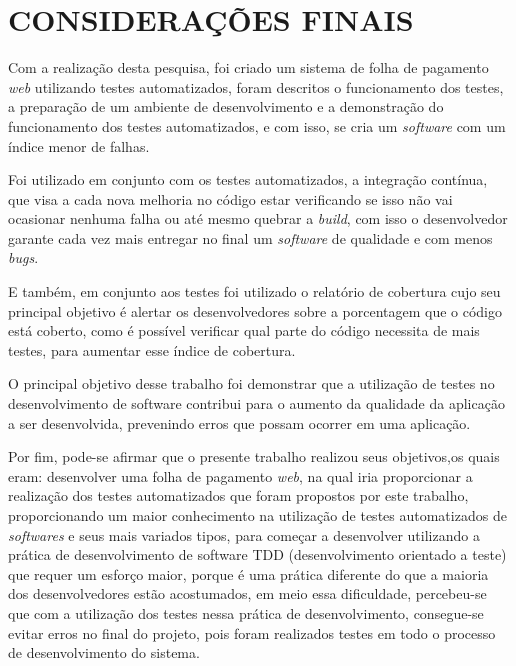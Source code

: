 

\chapter{CONSIDERAÇÕES FINAIS} 
\begin{comment}
\par A conclusão deste trabalho é \ldots

\par Assim conclui-se que \ldots
\end{comment}


\par Com a realização desta pesquisa, foi criado um sistema de folha de pagamento \textit{web} utilizando testes automatizados, foram descritos o funcionamento dos testes, a preparação de um ambiente de desenvolvimento e a demonstração do funcionamento dos testes automatizados, e com isso, se cria um \textit{software} com um índice menor de falhas.

\par Foi utilizado em conjunto com os testes automatizados, a integração contínua, que visa a cada nova melhoria no código estar verificando se isso não vai ocasionar nenhuma falha ou até mesmo quebrar a \textit{build}, com isso o desenvolvedor garante cada vez mais entregar no final um \textit{software} de qualidade e com menos \textit{bugs}.

\par E também, em conjunto aos testes foi utilizado o relatório de cobertura cujo seu principal objetivo é alertar os desenvolvedores sobre a porcentagem que o código está coberto, como é possível verificar qual parte do código necessita de mais testes, para aumentar esse índice de cobertura.

\par O principal objetivo desse trabalho foi demonstrar que a utilização de testes no desenvolvimento de software contribui para o aumento da qualidade da aplicação a ser desenvolvida, prevenindo erros que possam ocorrer em uma aplicação.

\par Por fim, pode-se afirmar que o presente trabalho realizou seus  objetivos,os quais eram: desenvolver uma folha de pagamento \textit{web}, na qual iria proporcionar a realização dos testes automatizados que foram propostos por este trabalho, proporcionando um maior conhecimento na utilização de testes automatizados de \textit{softwares} e seus mais variados tipos, para começar a desenvolver utilizando a prática de desenvolvimento de software TDD (desenvolvimento orientado a teste) que requer um esforço maior, porque é uma prática diferente do que a maioria dos desenvolvedores estão acostumados, em meio essa dificuldade, percebeu-se que com a utilização dos testes nessa prática de desenvolvimento, consegue-se evitar erros no final do projeto, pois foram realizados testes em todo o processo de desenvolvimento do sistema.

